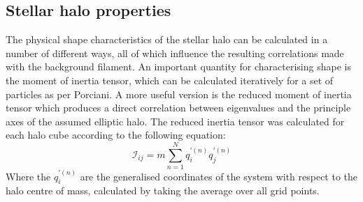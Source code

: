 \subsection{Stellar halo properties}
The physical shape characteristics of the stellar halo can be calculated in a number of different ways, all of which influence the resulting correlations made with the background filament. An important quantity for characterising shape is the moment of inertia tensor, which can be calculated iteratively for a set of particles as per Porciani\cite{porciani02a}. A more useful version is the reduced moment of inertia tensor\cite{tenneti15} which produces a direct correlation between eigenvalues and the principle axes of the assumed elliptic halo. The reduced inertia tensor was calculated for each halo cube according to the following equation:
\begin{equation}
\mathscr{I}_{ij}=m \sum_{n=1}^{N} q_{i}^{'(n)} q_{j}^{'(n)}
\label{eq:moitensor}
\end{equation}
Where the $q_{i}^{'(n)}$ are the generalised coordinates of the system with respect to the halo centre of mass, calculated by taking the average over all grid points.
